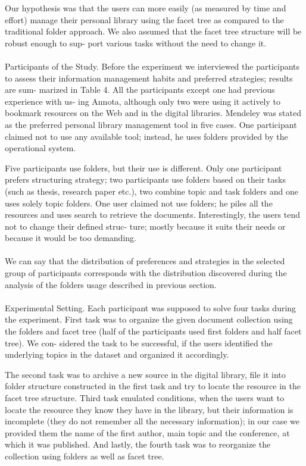 \documentclass{llncs}
\begin{document}
Our hypothesis was that the users can more easily (as measured by time and effort) manage their personal library using the facet tree as compared to the traditional folder approach. We also assumed that the facet tree structure will be robust enough to sup- port various tasks without the need to change it.\\ \\
Participants of the Study. Before the experiment we interviewed the participants to assess their information management habits and preferred strategies; results are sum- marized in Table 4. All the participants except one had previous experience with us- ing Annota, although only two were using it actively to bookmark resources on the Web and in the digital libraries. Mendeley was stated as the preferred personal library management tool in five cases. One participant claimed not to use any available tool; instead, he uses folders provided by the operational system.

Five participants use folders, but their use is different. Only one participant prefers structuring strategy; two participants use folders based on their tasks (such as thesis, research paper etc.), two combine topic and task folders and one uses solely topic folders. One user claimed not use folders; he piles all the resources and uses search to retrieve the documents. Interestingly, the users tend not to change their defined struc- ture; mostly because it suits their needs or because it would be too demanding. \\ \\
We can say that the distribution of preferences and strategies in the selected group of participants corresponds with the distribution discovered during the analysis of the folders usage described in previous section. \\ \\

Experimental Setting. Each participant was supposed to solve four tasks during the experiment. First task was to organize the given document collection using the folders
and facet tree (half of the participants used first folders and half facet tree). We con- sidered the task to be successful, if the users identified the underlying topics in the dataset and organized it accordingly.

The second task was to archive a new source in the digital library, file it into folder structure constructed in the first task and try to locate the resource in the facet tree structure. Third task emulated conditions, when the users want to locate the resource they know they have in the library, but their information is incomplete (they do not remember all the necessary information); in our case we provided them the name of the first author, main topic and the conference, at which it was published. And lastly, the fourth task was to reorganize the collection using folders as well as facet tree.
\end{document}
